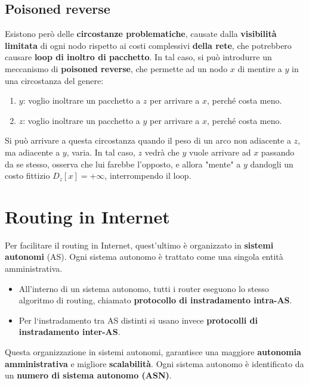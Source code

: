 \subsection{Poisoned reverse}
Esistono però delle \textbf{circostanze problematiche}, causate dalla \textbf{visibilità limitata} di ogni nodo rispetto ai costi complessivi \textbf{della rete}, che potrebbero causare \textbf{loop di inoltro di pacchetto}. In tal caso, si può introdurre un meccanismo di \textbf{poisoned reverse}, che permette ad un nodo $x$ di mentire a $y$ in una circostanza del genere:
\begin{enumerate}
	\item $y$: voglio inoltrare un pacchetto a $z$ per arrivare a $x$, perché costa meno.
	\item $z$: voglio inoltrare un pacchetto a $y$ per arrivare a $x$, perché costa meno.
\end{enumerate}
Si può arrivare a questa circostanza quando il peso di un arco non adiacente a $z$, ma adiacente a $y$, varia. In tal caso, $z$ vedrà che $y$ vuole arrivare ad $x$ passando da se stesso, osserva che lui farebbe l'opposto, e allora "mente" a $y$ dandogli un costo fittizio $D_z[x]=+\infty$, interrompendo il loop.

\newpage

\section{Routing in Internet}
Per facilitare il routing in Internet, quest'ultimo è organizzato in \textbf{sistemi autonomi} (AS). Ogni sistema autonomo è trattato come una singola entità amministrativa. 
\begin{itemize}
	\item All'interno di un sistema autonomo, tutti i router eseguono lo stesso algoritmo di routing, chiamato \textbf{protocollo di instradamento intra-AS}.
	\item Per l‘instradamento tra AS distinti si usano invece \textbf{protocolli di instradamento inter-AS}.
\end{itemize} 
Questa organizzazione in sistemi autonomi, garantisce una maggiore \textbf{autonomia amministrativa} e migliore \textbf{scalabilità}. Ogni sistema autonomo è identificato da un \textbf{numero di sistema autonomo (ASN)}.

